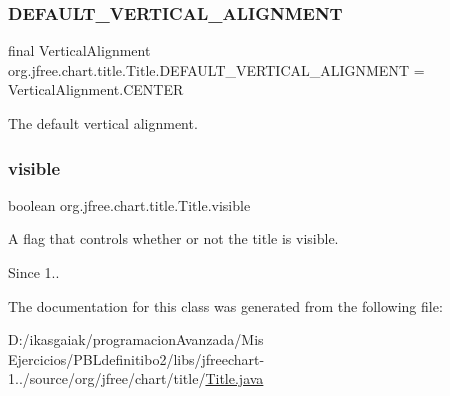 \subsubsection{\texorpdfstring{D\+E\+F\+A\+U\+L\+T\+\_\+\+V\+E\+R\+T\+I\+C\+A\+L\+\_\+\+A\+L\+I\+G\+N\+M\+E\+NT}{DEFAULT\_VERTICAL\_ALIGNMENT}}
{\footnotesize\ttfamily final Vertical\+Alignment org.\+jfree.\+chart.\+title.\+Title.\+D\+E\+F\+A\+U\+L\+T\+\_\+\+V\+E\+R\+T\+I\+C\+A\+L\+\_\+\+A\+L\+I\+G\+N\+M\+E\+NT = Vertical\+Alignment.\+C\+E\+N\+T\+ER\hspace{0.3cm}{\ttfamily [static]}}

The default vertical alignment. \mbox{\label{classorg_1_1jfree_1_1chart_1_1title_1_1_title_a8f9f60ec3aba4b287ca8cd9c591cd179}} 
\subsubsection{\texorpdfstring{visible}{visible}}
{\footnotesize\ttfamily boolean org.\+jfree.\+chart.\+title.\+Title.\+visible}

A flag that controls whether or not the title is visible.

\begin{DoxySince}{Since}
1.. 
\end{DoxySince}


The documentation for this class was generated from the following file\+:\begin{DoxyCompactItemize}
\item 
D\+:/ikasgaiak/programacion\+Avanzada/\+Mis Ejercicios/\+P\+B\+Ldefinitibo2/libs/jfreechart-\/1../source/org/jfree/chart/title/\mbox{\hyperlink{_title_8java}{Title.\+java}}\end{DoxyCompactItemize}
